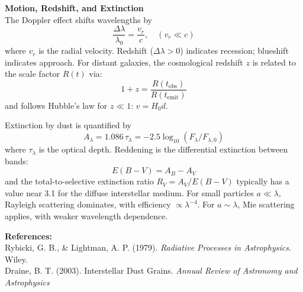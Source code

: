 \begin{technical}
\noindent\textbf{Motion, Redshift, and Extinction}\\[0.5em]
The Doppler effect shifts wavelengths by
\[
\frac{\Delta \lambda}{\lambda_0} = \frac{v_r}{c}, \quad (v_r \ll c)
\]
where \( v_r \) is the radial velocity. Redshift (\( \Delta \lambda > 0 \)) indicates recession; blueshift indicates approach. For distant galaxies, the cosmological redshift \( z \) is related to the scale factor \( R(t) \) via:
\[
1 + z = \frac{R(t_{\text{obs}})}{R(t_{\text{emit}})}
\]
and follows Hubble's law for \( z \ll 1 \): \( v = H_0 d \).

Extinction by dust is quantified by
\[
A_\lambda = 1.086\, \tau_\lambda = -2.5 \log_{10} \left( {F_\lambda}/{F_{\lambda,0}} \right)
\]
where \( \tau_\lambda \) is the optical depth. Reddening is the differential extinction between bands:
\[
E(B - V) = A_B - A_V
\]
and the total-to-selective extinction ratio \( R_V = A_V / E(B - V) \) typically has a value near 3.1 for the diffuse interstellar medium. For small particles \( a \ll \lambda \), Rayleigh scattering dominates, with efficiency \( \propto \lambda^{-4} \). For \( a \sim \lambda \), Mie scattering applies, with weaker wavelength dependence.

\vspace{0.5em}
\noindent\textbf{References:}\\
Rybicki, G. B., \& Lightman, A. P. (1979). \textit{Radiative Processes in Astrophysics}. Wiley.\\
Draine, B. T. (2003). Interstellar Dust Grains. \textit{Annual Review of Astronomy and Astrophysics}
\end{technical}
